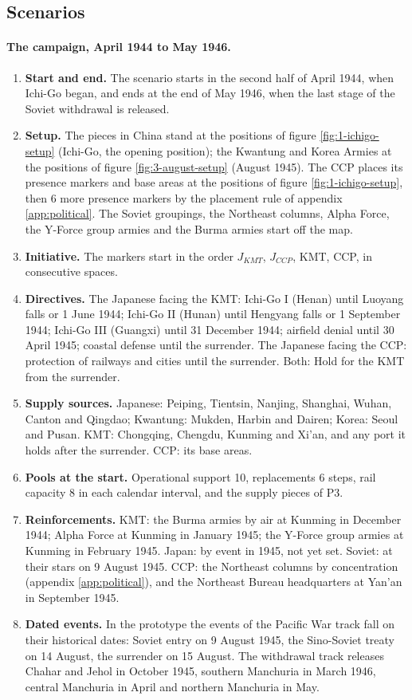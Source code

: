\documentclass[11pt]{article}
\begin{document}
\subsection{Scenarios}\label{app:scenario}
\draft
\paragraph{The campaign, April 1944 to May 1946.}
\begin{enumerate}
\item \textbf{Start and end.} The scenario starts in the second half of April 1944, when Ichi-Go began, and ends at the end of May 1946, when the last stage of the Soviet withdrawal is released.
\item \textbf{Setup.} The pieces in China stand at the positions of figure \ref{fig:1-ichigo-setup} (Ichi-Go, the opening position); the Kwantung and Korea Armies at the positions of figure \ref{fig:3-august-setup} (August 1945). The CCP places its presence markers and base areas at the positions of figure \ref{fig:1-ichigo-setup}, then 6 more presence markers by the placement rule of appendix \ref{app:political}. The Soviet groupings, the Northeast columns, Alpha Force, the Y-Force group armies and the Burma armies start off the map.
\item \textbf{Initiative.} The markers start in the order $J_{KMT}$, $J_{CCP}$, KMT, CCP, in consecutive spaces.
\item \textbf{Directives.} The Japanese facing the KMT: Ichi-Go I (Henan) until Luoyang falls or 1 June 1944; Ichi-Go II (Hunan) until Hengyang falls or 1 September 1944; Ichi-Go III (Guangxi) until 31 December 1944; airfield denial until 30 April 1945; coastal defense until the surrender. The Japanese facing the CCP: protection of railways and cities until the surrender. Both: Hold for the KMT from the surrender.
\item \textbf{Supply sources.} Japanese: Peiping, Tientsin, Nanjing, Shanghai, Wuhan, Canton and Qingdao; Kwantung: Mukden, Harbin and Dairen; Korea: Seoul and Pusan. KMT: Chongqing, Chengdu, Kunming and Xi'an, and any port it holds after the surrender. CCP: its base areas.
\item \textbf{Pools at the start.} Operational support 10, replacements 6 steps, rail capacity 8 in each calendar interval, and the supply pieces of P3.
\item \textbf{Reinforcements.} KMT: the Burma armies by air at Kunming in December 1944; Alpha Force at Kunming in January 1945; the Y-Force group armies at Kunming in February 1945. Japan: by event in 1945, not yet set. Soviet: at their stars on 9 August 1945. CCP: the Northeast columns by concentration (appendix \ref{app:political}), and the Northeast Bureau headquarters at Yan'an in September 1945.
\item \textbf{Dated events.} In the prototype the events of the Pacific War track fall on their historical dates: Soviet entry on 9 August 1945, the Sino-Soviet treaty on 14 August, the surrender on 15 August. The withdrawal track releases Chahar and Jehol in October 1945, southern Manchuria in March 1946, central Manchuria in April and northern Manchuria in May.
\end{enumerate}
\end{document}
